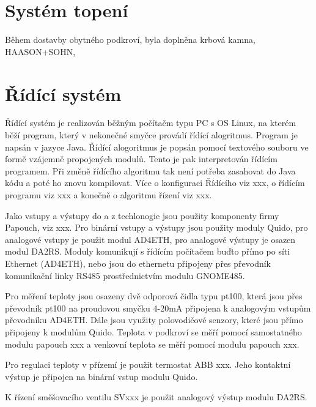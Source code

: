 \documentclass[a4paper,draft]{book}
\begin{document}
\chapter{Systém topení}\label{chap:heating}

    Během dostavby obytného podkroví, byla doplněna krbová kamna, HAASON+SOHN,

    \begin{tikzpicture}
        
    \end{tikzpicture}

\chapter{Řídící systém}\label{chap:control}

    Řídící systém je realizován běžným počítačm typu PC s OS Linux, na kterém
    běží program, který v nekonečné smyčce provádí řídící alogritmus. Program
    je napsán v jazyce Java. Řídící alogoritmus je popsán pomocí textového
    souboru ve formě vzájemně propojených modulů. Tento je pak interpretován
    řídícím programem. Při změně řídícího algoritmu tak není potřeba zasahovat
    do Java kódu a poté ho znovu kompilovat. Více o konfiguraci Řídícího
    viz xxx, o řídícím programu viz xxx a konečně o algoritmu řízení viz xxx.

    Jako vstupy a výstupy do a z techlonogie jsou použity komponenty firmy
    Papouch, viz xxx. Pro binární vstupy a výstupy jsou použity moduly Quido,
    pro analogové vstupy je použit modul AD4ETH, pro analogové výstupy je
    osazen modul DA2RS. Moduly komunikují s řídícím počítačem buďto přímo
    po síti Ethernet (AD4ETH), nebo jsou do ethernetu připojeny přes převodník
    komunikační linky RS485 prostřednictvím modulu GNOME485.

    Pro měření teploty jsou osazeny dvě odporová čidla typu pt100, která jsou
    přes převodník pt100 na proudovou smyčku 4-20mA připojena k analogovým
    vstupům převodníku AD4ETH. Dále jsou využity polovodičové senzory, které
    jsou přímo připojeny k modulům Quido. Teplota v podkroví se měří pomocí
    samostatného modulu papouch xxx a venkovní teplota se měří pomocí modulu
    papouch xxx.

    Pro regulaci teploty v přízemí je použit termostat ABB xxx. Jeho kontaktní
    výstup je připojen na binární vstup modulu Quido.

    K řízení směšovacího ventilu SVxxx je použit analogový výstup modulu DA2RS.
\end{document}
